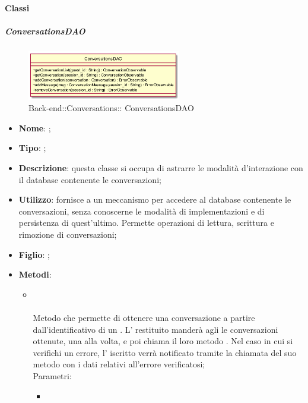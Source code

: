 \paragraph{Classi}
\hypertarget{ ConversationsDAO_label}{\subparagraph{ ConversationsDAO}}
\begin{figure}[h]
	\centering
	\includegraphics[width=0.60\textwidth,height=\textheight,keepaspectratio]{images/ClassConversationsDAO.png}
	\caption{Back-end::Conversations:: ConversationsDAO}
\end{figure}
\begin{itemize}
	\item \textbf{Nome}: ;
	\item \textbf{Tipo}: ;
	\item \textbf{Descrizione}: questa classe si occupa di astrarre le modalità d'interazione con il database contenente le conversazioni;
	\item \textbf{Utilizzo}: fornisce a  un meccanismo per accedere al database contenente le conversazioni, senza conoscerne le modalità di implementazioni e di persistenza di quest'ultimo. Permette operazioni di lettura, scrittura e rimozione di conversazioni;
	\item \textbf{Figlio}: ;
	\item \textbf{Metodi}:
	\begin{itemize}
		\item[] \\ \\		Metodo che permette di ottenere una conversazione a partire dall'identificativo di un . L' restituito manderà agli  le conversazioni ottenute, una alla volta, e poi chiama il loro metodo . Nel caso in cui si verifichi un errore, l' iscritto verrà notificato tramite la chiamata del suo metodo  con i dati relativi all'errore verificatosi;\\
		Parametri:
		\begin{itemize}
			\item {} \\

\end{itemize}
\end{itemize}
\end{itemize}

